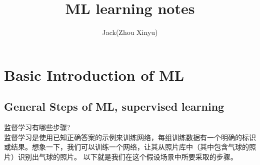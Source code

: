 \documentclass[10pt]{article}
\author{Jack(Zhou Xinyu)}
\title{ML learning notes}
\begin{document}
\maketitle  
\newpage

\tableofcontents
\newpage

\section{Basic Introduction of ML}
  \subsection{General Steps of ML, supervised learning}
  监督学习有哪些步骤?\\
  监督学习是使用已知正确答案的示例来训练网络，每组训练数据有一个明确的标识或结果。想象一下，我们可以训练一个网络，让其从照片库中（其中包含气球的照片）识别出气球的照片。
  以下就是我们在这个假设场景中所要采取的步骤。\\
\end{document}
